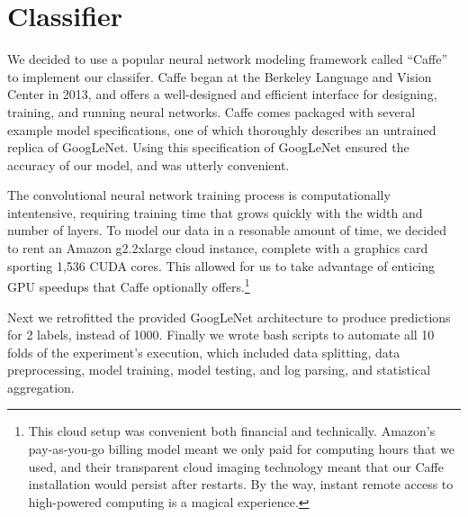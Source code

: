 \documentclass[midd]{thesis}
\begin{document}

\section{Classifier}

We decided to use a popular neural network modeling framework called ``Caffe'' to implement our classifer. Caffe began at the Berkeley Language and Vision Center in 2013, and offers a well-designed and efficient interface for designing, training, and running neural networks. Caffe comes packaged with several example model specifications, one of which thoroughly describes an untrained replica of GoogLeNet. Using this specification of GoogLeNet ensured the accuracy of our model, and was utterly convenient.

The convolutional neural network training process is computationally intentensive, requiring training time that grows quickly with the width and number of layers. To model our data in a resonable amount of time, we decided to rent an Amazon g2.2xlarge cloud instance, complete with a graphics card sporting 1,536 CUDA cores. This allowed for us to take advantage of enticing GPU speedups that Caffe optionally offers.\footnote{This cloud setup was convenient both financial and technically. Amazon's pay-as-you-go billing model meant we only paid for computing hours that we used, and their transparent cloud imaging technology meant that our Caffe installation would persist after restarts. By the way, instant remote access to high-powered computing is a magical experience.}

Next we retrofitted the provided GoogLeNet architecture to produce predictions for 2 labels, instead of 1000. Finally we wrote bash scripts to automate all 10 folds of the experiment's execution, which included data splitting, data preprocessing, model training, model testing, and log parsing, and statistical aggregation.
\end{document}
